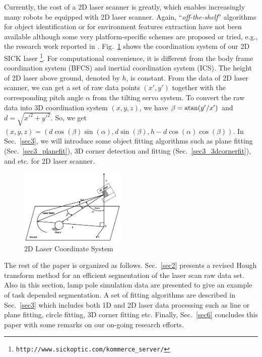 \documentclass{cdcarta4}
\begin{document}
Currently, the cost of a 2D laser scanner is greatly, which enables increasingly many robots be equipped with 2D laser scanner. Again, ``{\em off-the-shelf}'' algorithms for object identification  or for environment features extraction have not been available although some very platform-specific schemes are proposed or tried, e.g., the research work reported in \cite{Dedieu00Mixed,Hartmart2001ISR,Taylor1996,Vandorpe1996,Cadenat2000,Laurent1997,Borenstein96WhereAmI}.
Fig.~\ref{fig:2dlaser} shows the coordination system of our 2D SICK laser \footnote{\texttt{http://www.sickoptic.com/kommerce\_server/}}. For computational  convenience, it is different from the body frame coordination system (BFCS) and inertial coordination system (ICS). The height of 2D laser above ground, denoted by $h$,  is  constant. From the data of 2D laser scanner, we can get a set of raw data points $(x',y')$ together with  the corresponding pitch angle $\alpha$ from the tilting servo system. To convert  the raw data  into 3D coordination system $(x,y,z)$, we have
$   \beta={\rm atan} (y'/x')  $ and $ d = \sqrt{x'^2 + y'^2} $. So, we get $ (x,y,z)=(d \cos(\beta)\sin(\alpha), d \sin(\beta), h-d \cos(\alpha)\cos(\beta) )$.
In Sec.~\ref{sec3}, we will introduce some object fitting algorithms such as plane fitting (Sec.~\ref{sec3_planefit}), 3D corner detection  and  fitting (Sec.~\ref{sec3_3dcornerfit}), and etc. for 2D laser scanner.

\begin{figure}[!htb]
    \center\includegraphics[width=0.45\textwidth]{img/2Dlaser}
    \caption{2D Laser Coordinate System }
\label{fig:2dlaser}
\end{figure}



The rest of the paper is organized as follows. 
Sec.~\ref{sec2} presents a revised Hough transform method
for an efficient segmentation of the laser scan raw data set.
Also in this section, lamp pole simulation data are presented to give
an example of task depended segmentation.
A set of fitting algorithms are described in Sec.~\ref{sec3} which includes both 1D  and 2D laser data processing such as line or plane fitting, circle fitting, 3D corner fitting etc. 
%
Finally, Sec.~\ref{sec6} concludes this paper with some remarks on our on-going research efforts.
\end{document}
